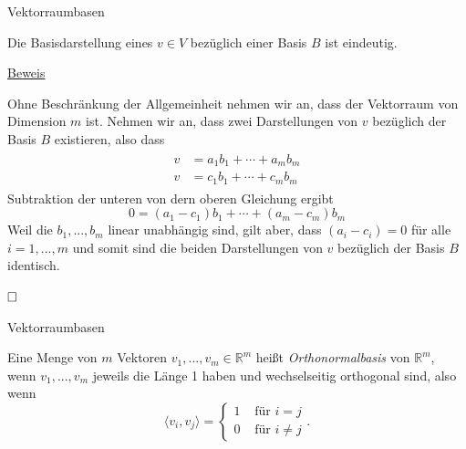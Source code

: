 \documentclass[
  8pt,
  ignorenonframetext,
]{beamer}
\begin{document}
\begin{frame}{Vektorraumbasen}
\protect\hypertarget{vektorraumbasen-3}{}
\small
\begin{theorem}
\normalfont
Die Basisdarstellung eines $v \in V$ bezüglich einer Basis $B$ ist eindeutig.
\end{theorem}

\footnotesize

\underline{Beweis} \vspace{1mm}

Ohne Beschränkung der Allgemeinheit nehmen wir an, dass der Vektorraum
von Dimension \(m\) ist. Nehmen wir an, dass zwei Darstellungen von
\(v\) bezüglich der Basis \(B\) existieren, also dass \begin{align}
\begin{split}
v & = a_1 b_1 + \cdots + a_m b_m \\
v & = c_1 b_1 + \cdots + c_m b_m
\end{split}
\end{align} Subtraktion der unteren von dern oberen Gleichung ergibt
\begin{equation}
0 = (a_1 - c_1) b_1 + \cdots + (a_m - c_m) b_m
\end{equation} Weil die \(b_1,...,b_m\) linear unabhängig sind, gilt
aber, dass \((a_i - c_i) = 0\) für alle \(i = 1,...,m\) und somit sind
die beiden Darstellungen von \(v\) bezüglich der Basis \(B\) identisch.

\(\hfill\Box\)
\end{frame}

\begin{frame}{Vektorraumbasen}
\protect\hypertarget{vektorraumbasen-4}{}
\small
\begin{definition}
Eine Menge von $m$ Vektoren $v_1,...,v_m \in \mathbb{R}^m$ heißt
\textit{Orthonormalbasis} von $\mathbb{R}^m$, wenn $v_1,...,v_m$ jeweils die
Länge 1 haben und wechselseitig orthogonal sind, also wenn
\begin{equation}
\langle v_i, v_j \rangle =
\begin{cases}
1   & \mbox{ für } i = j    \\
0   & \mbox{ für } i \neq j
\end{cases}.
\end{equation}
\end{definition}
\end{frame}
\end{document}
